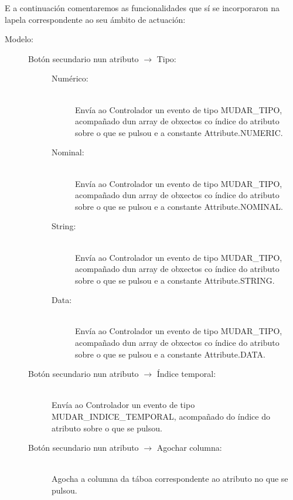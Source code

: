 E a continuación comentaremos as funcionalidades que sí se incorporaron na lapela correspondente ao seu ámbito de actuación:

\begin{description}

\item[Modelo:] \hfill

\begin{description}

\item[Botón secundario nun atributo $\rightarrow$ Tipo:] \hfill

\begin{description}

\item[Numérico:] \hfill \\
Envía ao Controlador un evento de tipo MUDAR\_TIPO, acompañado dun array de obxectos co índice do atributo sobre o que se pulsou e a constante Attribute.NUMERIC.

\item[Nominal:] \hfill \\
Envía ao Controlador un evento de tipo MUDAR\_TIPO, acompañado dun array de obxectos co índice do atributo sobre o que se pulsou e a constante Attribute.NOMINAL.

\item[String:] \hfill \\
Envía ao Controlador un evento de tipo MUDAR\_TIPO, acompañado dun array de obxectos co índice do atributo sobre o que se pulsou e a constante Attribute.STRING.

\item[Data:] \hfill \\
Envía ao Controlador un evento de tipo MUDAR\_TIPO, acompañado dun array de obxectos co índice do atributo sobre o que se pulsou e a constante Attribute.DATA.

\end{description}

\item[Botón secundario nun atributo $\rightarrow$ Índice temporal:] \hfill \\
Envía ao Controlador un evento de tipo MUDAR\_INDICE\_TEMPORAL, acompañado do índice do atributo sobre o que se pulsou.

\item[Botón secundario nun atributo $\rightarrow$ Agochar columna:] \hfill \\
Agocha a columna da táboa correspondente ao atributo no que se pulsou.


\end{description}
\end{description}
